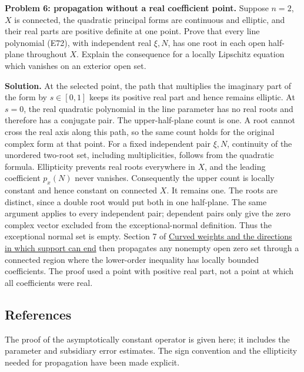 \documentclass[
  11pt,
]{article}
\makeatletter
\let\ReaderOriginalAnchorStart\hyper@anchorstart
\let\ReaderOriginalAnchorEnd\hyper@anchorend
\let\ReaderPendingAliases\@empty
\def\ReaderArmAliases#1{\gdef\ReaderPendingAliases{#1}}
\def\hyper@anchorstart#1{\ReaderIfNativeAnchorTF{#1}{\ReaderPendingAliases\global\let\ReaderPendingAliases\@empty}{}\ReaderOriginalAnchorStart{#1}}
\makeatother
\begin{document}
\textbf{Problem 6: propagation without a real coefficient point.}
Suppose \(n=2\), \(X\) is connected, the quadratic principal forms are
continuous and elliptic, and their real parts are positive definite at
one point. Prove that every line polynomial (E72), with independent real
\(\xi,N\), has one root in each open half-plane throughout \(X\).
Explain the consequence for a locally Lipschitz equation which vanishes
on an exterior open set.

\textbf{Solution.} At the selected point, the path that multiplies the
imaginary part of the form by \(s\in[0,1]\) keeps its positive real part
and hence remains elliptic. At \(s=0\), the real quadratic polynomial in
the line parameter has no real roots and therefore has a conjugate pair.
The upper-half-plane count is one. A root cannot cross the real axis
along this path, so the same count holds for the original complex form
at that point. For a fixed independent pair \(\xi,N\), continuity of the
unordered two-root set, including multiplicities, follows from the
quadratic formula. Ellipticity prevents real roots everywhere in \(X\),
and the leading coefficient \(p_x(N)\) never vanishes. Consequently the
upper count is locally constant and hence constant on connected \(X\).
It remains one. The roots are distinct, since a double root would put
both in one half-plane. The same argument applies to every independent
pair; dependent pairs only give the zero complex vector excluded from
the exceptional-normal definition. Thus the exceptional normal set is
empty. Section 7 of \href{support-continuation.pdf}{Curved weights and
the directions in which support can end} then propagates any nonempty
open zero set through a connected region where the lower-order
inequality has locally bounded coefficients. The proof used a point with
positive real part, not a point at which all coefficients were real.

\ReaderArmAliases{\ReaderOriginalAnchorStart{reading-routes-mathematical-antecedents-and-license}\ReaderOriginalAnchorEnd\begingroup\expandafter\def\csname @currentHref\endcsname{reading-routes-mathematical-antecedents-and-license}\label{reading-routes-mathematical-antecedents-and-license}\endgroup\ReaderOriginalAnchorStart{references}\ReaderOriginalAnchorEnd}
\subsection{References}\label{references}

The proof of the asymptotically constant operator is given here; it
includes the parameter and subsidiary error estimates. The sign
convention and the ellipticity needed for propagation have been made
explicit.
\end{document}
